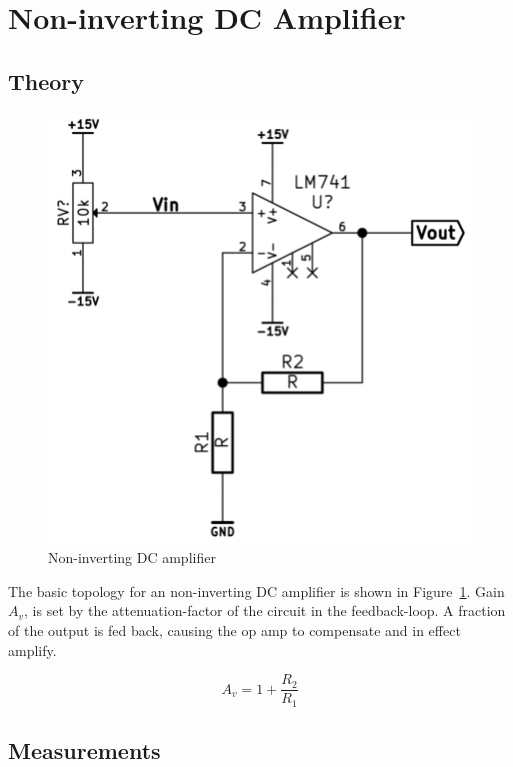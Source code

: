 \documentclass[]{article}
\begin{document}
\section{Non-inverting DC Amplifier}\label{non-inverting-dc-amplifier}

\subsection{Theory}\label{noninvDC-theory}

\begin{figure}[htbp]
    \centering
    \includegraphics[scale=0.5]{img/noninvDCamp.png}
    \caption{Non-inverting DC amplifier}
    \label{fig:noninvDCamp}
\end{figure}

The basic topology for an non-inverting DC amplifier is shown in Figure~\ref{fig:noninvDCamp}.
Gain $A_v$, is set by the attenuation-factor of the circuit in the feedback-loop. 
A fraction of the output is fed back, causing the op amp to compensate and in effect amplify.

\begin{equation}
    A_v = 1+\frac{R_2}{R_1}
\end{equation}


\subsection{Measurements}\label{measurements-2}
\end{document}
